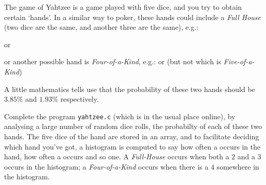 \newcommand{\fivedice}[5]{\epsdice[white]{#1}\epsdice[white]{#2}\epsdice[white]{#3}\epsdice[white]{#4}\epsdice[white]{#5}}


The game of Yahtzee is a game played with five dice, and you
try to obtain certain `hands'.
In a similar way to poker, these hands could include a {\it Full House} (two dice are the same, and another three are the same), e.g.:

\fivedice{6}{6}{1}{6}{1}
or  
\fivedice{4}{1}{1}{1}{4}

\noindent or another possible hand is {\it Four-of-a-Kind}, e.g.:
\fivedice{3}{3}{1}{3}{3}
or 
\fivedice{5}{5}{5}{2}{5}
(but not
\fivedice{3}{3}{3}{3}{3}
which is {\it Five-of-a-Kind})

A little mathematics tells use that the probability of these two hands should be $3.85\%$ and $1.93\%$ respectively.
\begin{exercise}

Complete the program \verb^yahtzee.c^ (which is in the usual place
online), by analysing a large number of random dice rolls, the probabilty
of each of these two hands.  The five dice of the hand are stored in an
array, and to facilitate deciding which hand you've got, a histogram is
computed to say how often a  occurs in the hand, how
often a  occurs and so one. A {\it Full-House} occurs
when both a $2$ and a $3$ occurs in the histogram; a {\it Four-of-a-Kind}
occurs when there is a $4$ somewhere in the histogram.

\end{exercise}
